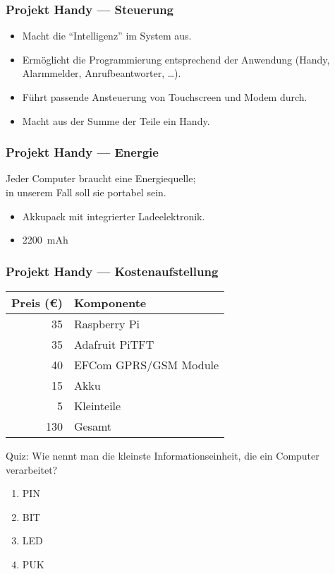 \begin{frame}
	\frametitle{Projekt Handy --- Steuerung}

	\begin{itemize}
		\item Macht die ``Intelligenz'' im System aus.
		\item Ermöglicht die Programmierung entsprechend der Anwendung (Handy, Alarmmelder, Anrufbeantworter, \ldots).
		\item Führt passende Ansteuerung von Touchscreen und Modem durch.
		\item Macht aus der Summe der Teile ein Handy.
	\end{itemize}

\end{frame}

\begin{frame}
	\frametitle{Projekt Handy --- Energie}
	Jeder Computer braucht eine Energiequelle; \\
	in unserem Fall soll sie portabel sein.
	\vspace{-0.5cm}
	\begin{itemize}
		\item Akkupack mit integrierter Ladeelektronik.
		\item \SI{2200}{mAh}
	\end{itemize}
\end{frame}

\begin{frame}
	\frametitle{Projekt Handy --- Kostenaufstellung}
	\begin{center}
		\begin{tabular}{rl} \toprule
			Preis (\euro) & Komponente \\ \midrule
			35 & Raspberry Pi\\
			35 & Adafruit PiTFT\\
			40 & EFCom GPRS/GSM Module\\
			15 & Akku\\
			5 & Kleinteile\\\cmidrule(lr){1-2}
			130 & Gesamt\\
			\bottomrule
		\end{tabular}
	\end{center}
\end{frame}


\begin{frame}
    \centering
	\begin{block}{Quiz:}
		Wie nennt man die kleinste Informationseinheit, die ein Computer
		verarbeitet?
		\begin{enumerate}
			\item PIN
			\item BIT
			\item LED
			\item PUK
		\end{enumerate}
	\end{block}

	\medskip

\end{frame}

